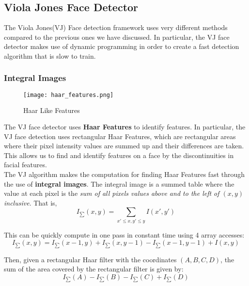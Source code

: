 \documentclass[12pt]{article}
\begin{document}
\subsection{Viola Jones Face Detector}

The Viola Jones(VJ) Face detection framework uses very different methods compared to the previous ones we have discussed. In particular, the VJ face detector makes use of dynamic programming in order to create a fast detection algorithm that is slow to train.

\subsubsection{Integral Images}

\begin{figure}[!htb]
\centering
  \texttt{[image: haar\_features.png]}
  \caption{Haar Like Features}
  \label{fig:AP}
\end{figure}

The VJ face detector uses \textbf{Haar Features} to identify features. In particular, the VJ face detection uses rectangular Haar Features, which are rectangular areas where their pixel intensity values are summed up and their differences are taken. This allows us to find and identify features on a face by the discontinuities in facial features. \\

The VJ algorithm makes the computation for finding Haar Features fast through the use of \textbf{integral images}. The integral image is a summed table where the value at each pixel is the \textit{sum of all pixels values above and to the left of $(x, y)$ inclusive}. That is, 
\begin{equation*}
I_{\sum}(x, y) = \sum_{x' \leq x, y' \leq y} I(x', y')
\end{equation*} 

This can be quickly compute in one pass in constant time using 4 array accesses: 
\begin{equation*}
I_{\sum}(x, y) =I_{\sum}(x-1, y) + I_{\sum}(x, y-1) - I_{\sum}(x-1, y-1) + I(x, y)
\end{equation*} 

Then, given a rectangular Haar filter with the coordinates $(A, B, C, D)$, the sum of the area covered by the rectangular filter is given by:
\begin{equation*}
I_{\sum}(A) - I_{\sum}(B) - I_{\sum}(C) + I_{\sum}(D)
\end{equation*}
\end{document}
